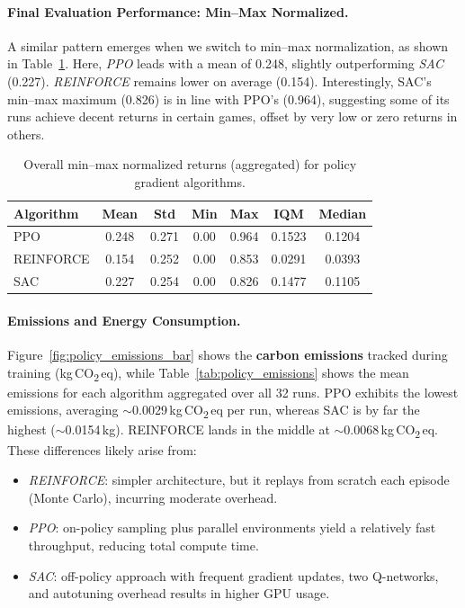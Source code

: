 \paragraph{Final Evaluation Performance: Min–Max Normalized.}
A similar pattern emerges when we switch to min–max normalization, as shown in Table~\ref{tab:policy_final_eval_minmax}. Here, \emph{PPO} leads with a mean of \num{0.248}, slightly outperforming \emph{SAC} (\num{0.227}). \emph{REINFORCE} remains lower on average (\num{0.154}). Interestingly, SAC's min–max maximum (\num{0.826}) is in line with PPO's (\num{0.964}), suggesting some of its runs achieve decent returns in certain games, offset by very low or zero returns in others.

\begin{table} 
	\centering
	\caption{Overall min--max normalized returns (aggregated) for policy gradient algorithms.}
	\label{tab:policy_final_eval_minmax}
	\begin{tabular}{lcccccc}
		\toprule
		\textbf{Algorithm} & \textbf{Mean} & \textbf{Std} & \textbf{Min} & \textbf{Max} & \textbf{IQM} & \textbf{Median} \\
		\midrule
		PPO         & 0.248 & 0.271 & 0.00 & 0.964 & 0.1523 & 0.1204 \\
		REINFORCE   & 0.154 & 0.252 & 0.00 & 0.853 & 0.0291 & 0.0393 \\
		SAC         & 0.227 & 0.254 & 0.00 & 0.826 & 0.1477 & 0.1105 \\
		\bottomrule
	\end{tabular}
\end{table}

\paragraph{Emissions and Energy Consumption.}
Figure~\ref{fig:policy_emissions_bar} shows the \textbf{carbon emissions} tracked during training (kg\,CO\textsubscript{2}\,eq), while Table~\ref{tab:policy_emissions} shows the mean emissions for each algorithm aggregated over all 32 runs. PPO exhibits the lowest emissions, averaging $\sim$\num{0.0029}\,kg\,CO\textsubscript{2}\,eq per run, whereas SAC is by far the highest ($\sim$\num{0.0154}\,kg). REINFORCE lands in the middle at $\sim$\num{0.0068}\,kg\,CO\textsubscript{2}\,eq. These differences likely arise from:
\begin{itemize}
	\item \emph{REINFORCE}: simpler architecture, but it replays from scratch each episode (Monte Carlo), incurring moderate overhead.  
	\item \emph{PPO}: on-policy sampling plus parallel environments yield a relatively fast throughput, reducing total compute time.  
	\item \emph{SAC}: off-policy approach with frequent gradient updates, two Q-networks, and autotuning overhead results in higher GPU usage.
\end{itemize}

